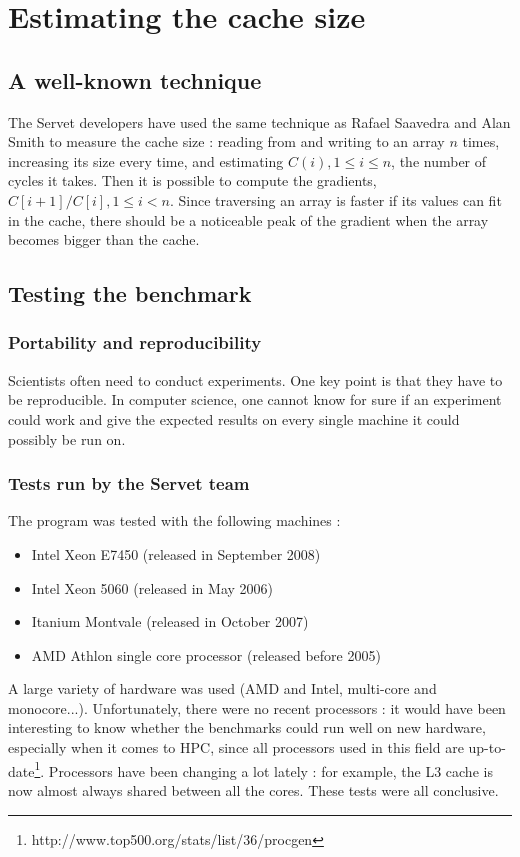 \section{Estimating the cache size}

\subsection{A well-known technique}
The Servet developers have used the same technique as Rafael Saavedra and Alan
Smith\cite{Cache_TLB} to measure the cache size : reading from and writing to an
array $n$ times, increasing its size every time, and estimating $C(i), 1 \le i
\le n$, the number of cycles it takes. Then it is possible to compute the
gradients, $C[i+1]/C[i], 1 \le i < n$. Since traversing an array is faster if
its values can fit in the cache, there should be a noticeable peak of the
gradient   when the array becomes bigger than the cache.

\subsection{Testing the benchmark}
\subsubsection{Portability and reproducibility}
Scientists often need to conduct experiments. One key point is that they have to
be reproducible. In computer science, one cannot know for sure if an experiment
could work and give the expected results on every single machine it could
possibly be run on. 

\subsubsection{Tests run by the Servet team}
The program was tested with the following machines :
    \begin{itemize}
        \item Intel Xeon E7450 (released in September 2008)
        \item Intel Xeon 5060 (released in May 2006)
        \item Itanium Montvale (released in October 2007)
        \item AMD Athlon single core processor (released before 2005)
    \end{itemize}

A large variety of hardware was used (AMD and Intel, multi-core and
monocore...). Unfortunately, there were no recent processors : it would have
been interesting to know whether the benchmarks could run well on new hardware,
especially when it comes to HPC, since all processors used in this field are
up-to-date\footnote{http://www.top500.org/stats/list/36/procgen}. Processors
have been changing a lot lately : for example, the L3 cache is now almost always
shared between all the cores.  These tests were all conclusive.

